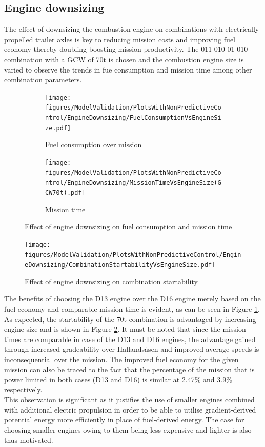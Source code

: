 \documentclass[ExampleMasters.tex]{subfiles}
\begin{document}
\subsection{Engine downsizing}
The effect of downsizing the combustion engine on combinations with electrically propelled trailer axles is key to reducing mission costs and improving fuel economy thereby doubling boosting mission productivity. The 011-010-01-010 combination with a GCW of 70t is chosen and the combustion engine size is varied to observe the trends in fue consumption and mission time among other combination parameters.
\begin{figure}
\begin{subfigure}{.5\textwidth}
\centering
\texttt{[image: figures/ModelValidation/PlotsWithNonPredictiveControl/EngineDownsizing/FuelConsumptionVsEngineSize.pdf]}
\caption{Fuel consumption over mission}
\end{subfigure}
\begin{subfigure}{.5\textwidth}
\centering
\texttt{[image: figures/ModelValidation/PlotsWithNonPredictiveControl/EngineDownsizing/MissionTimeVsEngineSize(GCW70t).pdf]}
\caption{Mission time}
\end{subfigure}
\caption{Effect of engine downsizing on fuel consumption and mission time}
\label{fuelTimeEngineDownsize}
\end{figure}
\begin{figure}
\centering
\texttt{[image: figures/ModelValidation/PlotsWithNonPredictiveControl/EngineDownsizing/CombinationStartabilityVsEngineSize.pdf]}
\caption{Effect of engine downsizing on combination startability}
\label{startabilityEngineDownsize}
\end{figure}
The benefits of choosing the D13 engine over the D16 engine merely based on the fuel economy and comparable mission time is evident, as can be seen in Figure \ref{fuelTimeEngineDownsize}. As expected, the startability of the 70t combination is advantaged by increasing engine size and is shown in Figure \ref{startabilityEngineDownsize}. It must be noted that since the mission times are comparable in case of the D13 and D16 engines, the advantage gained through increased gradeability over Hallands\aa sen and improved average speeds is inconsequential over the mission. The improved fuel economy for the given mission can also be traced to the fact that the percentage of the mission that is power limited in both cases (D13 and D16) is similar at 2.47\% and 3.9\% respectively.\\
This observation is significant as it justifies the use of smaller engines combined with additional electric propulsion in order to be able to utilise gradient-derived potential energy more efficiently in place of fuel-derived energy. The case for choosing smaller engines owing to them being less expensive and lighter is also thus motivated.\\
\end{document}
